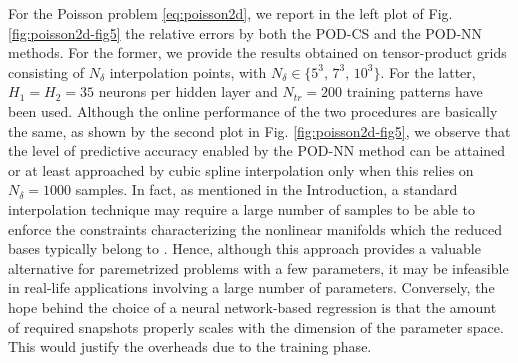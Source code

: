 \documentclass[longtitle]{elsarticle}
\numberwithin{equation}{section}
\theoremstyle{theorem}
\theoremstyle{definition}
\theoremstyle{remark}
\theoremstyle{proposition}
\numberwithin{figure}{section}
\begin{document}
		For the Poisson problem \eqref{eq:poisson2d}, we report in the left plot of Fig. \ref{fig:poisson2d-fig5} the relative errors by both the POD-CS and the POD-NN methods. For the former, we provide the results obtained on tensor-product grids consisting of $N_{\delta}$ interpolation points, with $N_{\delta} \in \lbrace 5^3, \, 7^3, \, 10^3 \rbrace$. For the latter, $H_1 = H_2 = 35$ neurons per hidden layer and $N_{tr} = 200$ training patterns have been used. Although the online performance of the two procedures are basically the same, as shown by the second plot in Fig. \ref{fig:poisson2d-fig5}, we observe that the level of predictive accuracy enabled by the POD-NN method can be attained or at least approached by cubic spline interpolation only when this relies on $N_{\delta} = 1000$ samples. In fact, as mentioned in the Introduction, a standard interpolation technique may require a large number of samples to be able to enforce the constraints characterizing the nonlinear manifolds which the reduced bases typically belong to \cite{Ams10}. Hence, although this approach provides a valuable alternative for paremetrized problems with a few parameters, it may be infeasible in real-life applications involving a large number of parameters. Conversely, the hope behind the choice of a neural network-based regression is that the amount of required snapshots properly scales with the dimension of the parameter space. This would justify the overheads due to the training phase.
		
\end{document}
